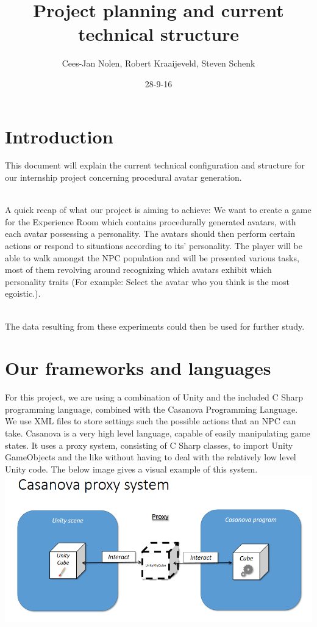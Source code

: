 \documentclass[11pt]{article} %
\title{Project planning and current technical structure}
\author{Cees-Jan Nolen, Robert Kraaijeveld, Steven Schenk}
\date{28-9-16}
\begin{document}
  \maketitle
  \newpage
  \tableofcontents

\newpage
\section{Introduction}
This document will explain the current technical configuration and structure for our internship project concerning procedural avatar generation. 

~\\
A quick recap of what our project is aiming to achieve: We want to create a game for the Experience Room which contains procedurally generated avatars, with each avatar possessing a personality. The avatars should then perform certain actions or respond to situations according to its' personality. The player will be able to walk amongst the NPC population and will be presented various tasks, most of them revolving around recognizing which avatars exhibit which personality traits (For example: Select the avatar who you think is the most egoistic.).

~\\
The data resulting from these experiments could then be used for further study.


\newpage
\section{Our frameworks and languages}
For this project, we are using a combination of Unity and the included C Sharp programming language, combined with the Casanova Programming Language. We use XML files to store settings such the possible actions that an NPC can take.
Casanova is a very high level language, capable of easily manipulating game states. It uses a proxy system, consisting of C Sharp classes, to import Unity GameObjects and the like without having to deal with the relatively low level Unity code. The below image gives a visual example of this system.
~\\

\includegraphics[scale=0.5]{proxySystem}
\end{document}
